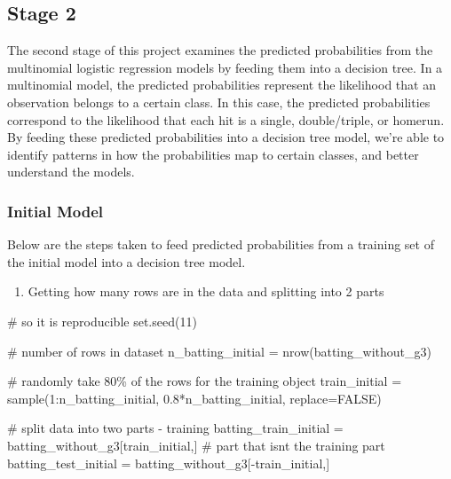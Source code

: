 \documentclass[
  letterpaper,
  DIV=11,
  numbers=noendperiod]{scrartcl}
\newenvironment{Shaded}{\begin{snugshade}}{\end{snugshade}}
\newcommand{\AttributeTok}[1]{\textcolor[rgb]{0.40,0.45,0.13}{#1}}
\newcommand{\CommentTok}[1]{\textcolor[rgb]{0.37,0.37,0.37}{#1}}
\newcommand{\ConstantTok}[1]{\textcolor[rgb]{0.56,0.35,0.01}{#1}}
\newcommand{\DecValTok}[1]{\textcolor[rgb]{0.68,0.00,0.00}{#1}}
\newcommand{\FloatTok}[1]{\textcolor[rgb]{0.68,0.00,0.00}{#1}}
\newcommand{\FunctionTok}[1]{\textcolor[rgb]{0.28,0.35,0.67}{#1}}
\newcommand{\NormalTok}[1]{\textcolor[rgb]{0.00,0.23,0.31}{#1}}
\newcommand{\OtherTok}[1]{\textcolor[rgb]{0.00,0.23,0.31}{#1}}
\newcommand{\SpecialCharTok}[1]{\textcolor[rgb]{0.37,0.37,0.37}{#1}}
\providecommand{\tightlist}{%
  \setlength{\itemsep}{0pt}\setlength{\parskip}{0pt}}\usepackage{longtable,booktabs,array}
\begin{document}
\subsection{Stage 2}\label{stage-2}

The second stage of this project examines the predicted probabilities
from the multinomial logistic regression models by feeding them into a
decision tree. In a multinomial model, the predicted probabilities
represent the likelihood that an observation belongs to a certain class.
In this case, the predicted probabilities correspond to the likelihood
that each hit is a single, double/triple, or homerun. By feeding these
predicted probabilities into a decision tree model, we're able to
identify patterns in how the probabilities map to certain classes, and
better understand the models.

\subsubsection{Initial Model}\label{initial-model-1}

Below are the steps taken to feed predicted probabilities from a
training set of the initial model into a decision tree model.

\begin{enumerate}
\def\labelenumi{\arabic{enumi}.}
\tightlist
\item
  Getting how many rows are in the data and splitting into 2 parts
\end{enumerate}

\begin{Shaded}
\begin{Highlighting}[]
\CommentTok{\# so it is reproducible}
\FunctionTok{set.seed}\NormalTok{(}\DecValTok{11}\NormalTok{)}

\CommentTok{\# number of rows in dataset }
\NormalTok{n\_batting\_initial }\OtherTok{=} \FunctionTok{nrow}\NormalTok{(batting\_without\_g3)}

\CommentTok{\# randomly take 80\% of the rows for the training object }
\NormalTok{train\_initial }\OtherTok{=} \FunctionTok{sample}\NormalTok{(}\DecValTok{1}\SpecialCharTok{:}\NormalTok{n\_batting\_initial,}
                   \FloatTok{0.8}\SpecialCharTok{*}\NormalTok{n\_batting\_initial,}
                   \AttributeTok{replace=}\ConstantTok{FALSE}\NormalTok{)}
\end{Highlighting}
\end{Shaded}

\begin{Shaded}
\begin{Highlighting}[]
\CommentTok{\# split data into two parts {-} training }
\NormalTok{batting\_train\_initial }\OtherTok{=}\NormalTok{ batting\_without\_g3[train\_initial,]}
\CommentTok{\# part that isn\textquotesingle{}t the training part}
\NormalTok{batting\_test\_initial }\OtherTok{=}\NormalTok{ batting\_without\_g3[}\SpecialCharTok{{-}}\NormalTok{train\_initial,]}
\end{Highlighting}
\end{Shaded}
\end{document}
